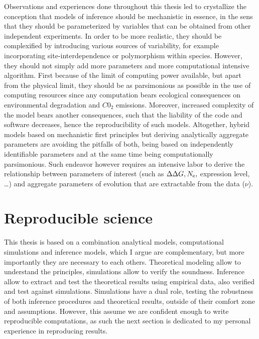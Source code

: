 Observations and experiences done throughout this thesis led to crystallize the conception that models of inference should be mechanistic in essence, in the sens that they should be parameterized by variables that can be obtained from other independent experiments.
In order to be more realistic, they should be complexified by introducing various sources of variability, for example incorporating site-interdependence or polymorphism within species.
However, they should not simply add more parameters and more computational intensive algorithm.
First because of the limit of computing power available, but apart from the physical limit, they should be as parsimonious as possible in the use of computing resources since any computation bears ecological consequences on environmental degradation and $C0_2$ emissions.
Moreover, increased complexity of the model bears another consequences, such that the liability of the code and software decreases, hence the reproducibility of such models.
Altogether, hybrid models based on mechanistic first principles but deriving analytically aggregate parameters are avoiding the pitfalls of both, being based on independently identifiable parameters and at the same time being computationally parsimonious.
Such endeavor however requires an intensive labor to derive the relationship between parameters of interest (such as $\Delta \Delta G, N_{\textrm{e}}, $ expression level, \ldots) and aggregate parameters of evolution that are extractable from the data ($\nu$).


\section{Reproducible science}
\label{sec:reproducible-science}

This thesis is based on a combination analytical models, computational simulations and inference models, which I argue are complementary, but more importantly they are necessary to each others.
Theoretical modeling allow to understand the principles, simulations allow to verify the soundness.
Inference allow to extract and test the theoretical results using empirical data, also verified and test against simulations.
Simulations have a dual role, testing the robustness of both inference procedures and theoretical results, outside of their comfort zone and assumptions.
However, this assume we are confident enough to write reproducible computations, as such the next section is dedicated to my personal experience in reproducing results.

